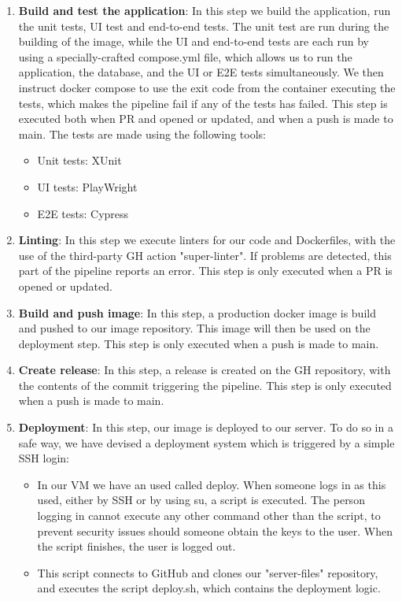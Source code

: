 \begin{enumerate}
	\item \textbf{Build and test the application}: In this step we build the application, run the unit tests, UI test and end-to-end tests. The unit test are run during the building of the image, while the UI and end-to-end tests are each run by using a specially-crafted compose.yml file, which allows us to run the application, the database, and the UI or E2E tests simultaneously. We then instruct docker compose to use the exit code from the container executing the tests, which makes the pipeline fail if any of the tests has failed. This step is executed both when PR and opened or updated, and when a push is made to main. The tests are made using the following tools:
	\begin{itemize}
		\item Unit tests: XUnit
		\item UI tests: PlayWright
		\item E2E tests: Cypress
	\end{itemize}
	\item \textbf{Linting}: In this step we execute linters for our code and Dockerfiles, with the use of the third-party GH action "super-linter". If problems are detected, this part of the pipeline reports an error. This step is only executed when a PR is opened or updated.
	\item \textbf{Build and push image}: In this step, a production docker image is build and pushed to our image repository. This image will then be used on the deployment step. This step is only executed when a push is made to main. 
	\item \textbf{Create release}: In this step, a release is created on the GH repository, with the contents of the commit triggering the pipeline. This step is only executed when a push is made to main. 
	\item \textbf{Deployment}: In this step, our image is deployed to our server. To do so in a safe way, we have devised a deployment system which is triggered by a simple SSH login:
	\begin{itemize}
		\item In our VM we have an used called deploy. When someone logs in as this used, either by SSH or by using su, a script is executed. The person logging in cannot execute any other command other than the script, to prevent security issues should someone obtain the keys to the user. When the script finishes, the user is logged out.
		\item This script connects to GitHub and clones our "server-files" repository, and executes the script deploy.sh, which contains the deployment logic.

\end{itemize}
\end{enumerate}
